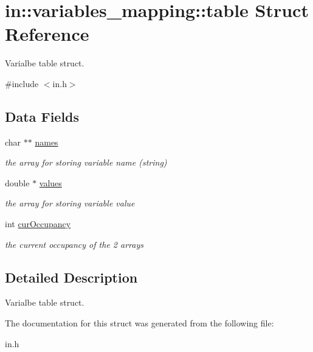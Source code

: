 \hypertarget{structin_1_1variables__mapping_1_1table}{\section{in\-:\-:variables\-\_\-mapping\-:\-:table Struct Reference}
\label{structin_1_1variables__mapping_1_1table}
}


Varialbe table struct.  




{\ttfamily \#include $<$in.\-h$>$}

\subsection*{Data Fields}
\begin{DoxyCompactItemize}
\item 
\hypertarget{structin_1_1variables__mapping_1_1table_a26fc633cf551a2621e172633486c85ef}{char $\ast$$\ast$ \hyperlink{structin_1_1variables__mapping_1_1table_a26fc633cf551a2621e172633486c85ef}{names}}\label{structin_1_1variables__mapping_1_1table_a26fc633cf551a2621e172633486c85ef}

\begin{DoxyCompactList}\small\item\em the array for storing variable name (string) \end{DoxyCompactList}\item 
\hypertarget{structin_1_1variables__mapping_1_1table_a2098158062e3e63fce7d2575b324c386}{double $\ast$ \hyperlink{structin_1_1variables__mapping_1_1table_a2098158062e3e63fce7d2575b324c386}{values}}\label{structin_1_1variables__mapping_1_1table_a2098158062e3e63fce7d2575b324c386}

\begin{DoxyCompactList}\small\item\em the array for storing variable value \end{DoxyCompactList}\item 
\hypertarget{structin_1_1variables__mapping_1_1table_aef8007b712486b5acb83207b52671d1e}{int \hyperlink{structin_1_1variables__mapping_1_1table_aef8007b712486b5acb83207b52671d1e}{cur\-Occupancy}}\label{structin_1_1variables__mapping_1_1table_aef8007b712486b5acb83207b52671d1e}

\begin{DoxyCompactList}\small\item\em the current occupancy of the 2 arrays \end{DoxyCompactList}\end{DoxyCompactItemize}


\subsection{Detailed Description}
Varialbe table struct. 

The documentation for this struct was generated from the following file\-:\begin{DoxyCompactItemize}
\item 
in.\-h\end{DoxyCompactItemize}
